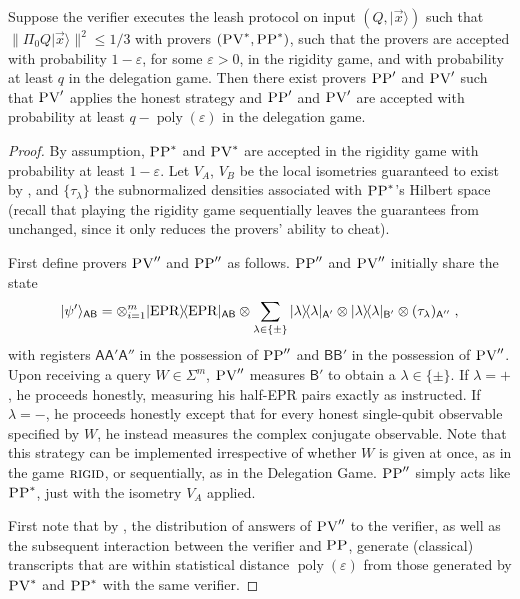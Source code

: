 \documentclass{toc}
\newcommand{\ket}[1]{|#1\rangle}
\newcommand{\bra}[1]{\langle#1|}
\newcommand{\proj}[1]{\ket{#1}\!\bra{#1}}
\DeclareMathOperator{\poly}{poly}
\newcommand{\reg}[1]{{\textsf{#1}}}
\newcommand{\eps}{\varepsilon}
\newcommand{\EPR}{{\rm EPR}}
\newcommand{\rigid}{\textsc{rigid}}
\newcommand{\pv}{\textsc{PV}}
\newcommand{\pp}{\textsc{PP}}
\begin{document}
\begin{lemma}\label{soundlemma}
Suppose the verifier executes the leash protocol  on input $(Q,\ket{\vec{x}})$ such that $\|\Pi_0 Q\ket{\vec{x}}\|^2 \leq 1/3$ with provers $(\pv^*,\pp^*)$, such that the provers are accepted with probability $1-\eps$, for some $\eps>0$, in the rigidity game, and with probability at least $q$ in the delegation game. Then there exist provers $\pp'$ and $\pv'$ such that $\pv'$ applies the honest strategy and $\pp'$ and $\pv'$ are accepted with probability at least $q-\poly(\eps)$ in the delegation game.
\end{lemma}

\begin{proof}
By assumption, $\pp^*$ and $\pv^*$ are accepted in the rigidity game with
  probability at least $1-\eps$. Let $V_A$, $V_B$ be the local isometries
  guaranteed to exist by , and
  $\{\tau_\lambda\}$ the subnormalized densities associated with $\pp^*$'s
  Hilbert space (recall that playing the rigidity game sequentially leaves the
  guarantees from  unchanged, since it only reduces the provers' ability to cheat).

First define provers $\pv''$ and $\pp''$ as follows. $\pp''$ and $\pv''$ initially share the state 
$$\ket{\psi'}_{\reg{AB}} = \otimes_{i=1}^{m} \proj{\EPR}_{\reg{AB}} \otimes \sum_{\lambda\in\{\pm\}}  \proj{\lambda}_{\reg{A}'}\otimes \proj{\lambda}_{\reg{B}'}\otimes (\tau_\lambda)_{\reg{A}''}\;,$$
with registers $\reg{A}\reg{A}'\reg{A}''$ in the possession of $\pp''$ and $\reg{BB}'$ in the possession of $\pv''$. 
Upon receiving a query $W\in \Sigma^m$, $\pv''$ measures $\reg{B}'$ to obtain a $\lambda\in\{\pm\}$. If $\lambda=+$, he proceeds honestly, measuring his half-EPR pairs exactly as instructed. If $\lambda=-$, he proceeds honestly except that for every honest single-qubit observable specified by $W$, he instead measures the complex conjugate observable. Note that this strategy can be implemented irrespective of whether $W$ is given at once, as in the game $\rigid$, or sequentially, as in the Delegation Game. $\pp''$ simply acts like $\pp^*$, just with the isometry $V_A$ applied. 

First note that by , the distribution of answers of $\pv''$ to the verifier, as well as the subsequent interaction between the verifier and $\pp$, generate (classical) transcripts that are within statistical distance $\poly(\eps)$ from those generated by $\pv^*$ and $\pp^*$ with the same verifier. 


\end{proof}
\end{document}

